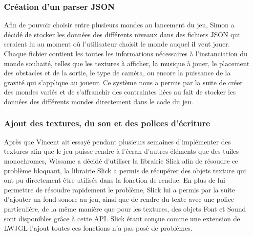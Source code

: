\subsubsection{Création d'un parser JSON}
Afin de pouvoir choisir entre plusieurs mondes au lancement du jeu, Simon a décidé de stocker les données des différents niveaux dans des fichiers JSON qui seraient lu au moment où l'utilisateur choisit le monde auquel il veut jouer.
\ml
Chaque fichier contient les toutes les informations nécessaires à l'instanciation du monde souhaité, telles que les textures à afficher, la musique à jouer, le placement des obstacles et de la sortie, le type de caméra, ou encore la puissance de la gravité qui s'applique au joueur.
\ml
Ce système nous a permis par la suite de créer des mondes variés et de s'affranchir des contraintes liées au fait de stocker les données des différents mondes directement dans le code du jeu.

\subsubsection{Ajout des textures, du son et des polices d'écriture}

Après que Vincent ait essayé pendant plusieurs semaines d'implémenter des textures afin que le jeu puisse rendre à l'écran d'autres éléments que des tuiles monochromes, Wissame a décidé d'utiliser la librairie Slick afin de résoudre ce problème bloquant, la librairie Slick a permis de récupérer des objets texture qui ont pu directement être utilisés dans la fonction de rendue.
\ml
En plus de lui permettre de résoudre rapidement le problème, Slick lui a permis par la suite d'ajouter un fond sonore au jeu, ainsi que de rendre du texte avec une police particulière, de la même manière que pour les textures, des objets Font et Sound sont disponibles grâce à cette API.
\ml
Slick étant conçue comme une extension de LWJGL l'ajout toutes ces fonctions n'a pas posé de problèmes.